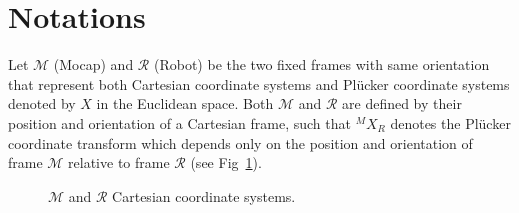 \section{Notations}

Let $\mathcal{M}$ (Mocap) and $\mathcal{R}$ (Robot) be the two fixed frames with same orientation that represent both Cartesian coordinate systems and Pl\"ucker coordinate systems denoted by $X$ in the Euclidean space. Both $\mathcal{M}$ and $\mathcal{R}$ are defined by their position and orientation of a Cartesian frame, such that ${}^MX_R$ denotes the Pl\"ucker coordinate transform which depends only on the position and orientation of frame $\mathcal{M}$ relative to frame $\mathcal{R}$ (see Fig~\ref{fig:frames}).

\begin{figure}[ht]
	\caption{$\mathcal{M}$ and $\mathcal{R}$ Cartesian coordinate systems.}
	\label{fig:frames}
\end{figure}


